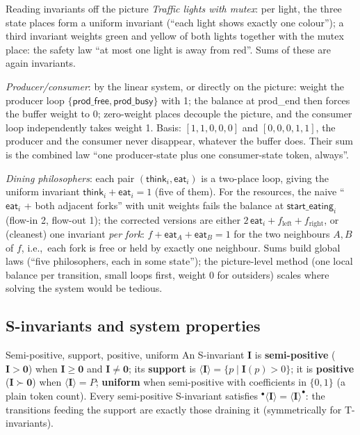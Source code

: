 \begin{examplebox}{Reading invariants off the picture}
\emph{Traffic lights with mutex}: per light, the three state places form a uniform invariant (``each light shows exactly one colour''); a third invariant weights green and yellow of both lights together with the mutex place: the safety law ``at most one light is away from red''. Sums of these are again invariants.
\par\smallskip
\emph{Producer/consumer}: by the linear system, or directly on the picture: weight the producer loop $\{\textsf{prod\_free}, \textsf{prod\_busy}\}$ with 1; the balance at \textsf{prod\_end} then forces the buffer weight to 0; zero-weight places decouple the picture, and the consumer loop independently takes weight 1. Basis: $[1,1,0,0,0]$ and $[0,0,0,1,1]$, the producer and the consumer never disappear, whatever the buffer does. Their sum is the combined law ``one producer-state plus one consumer-state token, always''.
\par\smallskip
\emph{Dining philosophers}: each pair $(\textsf{think}_i, \textsf{eat}_i)$ is a two-place loop, giving the uniform invariant $\textsf{think}_i + \textsf{eat}_i = 1$ (five of them). For the resources, the naive ``$\textsf{eat}_i$ + both adjacent forks'' with unit weights fails the balance at $\textsf{start\_eating}_i$ (flow-in 2, flow-out 1); the corrected versions are either $2\,\textsf{eat}_i + f_{\text{left}} + f_{\text{right}}$, or (cleanest) one invariant \emph{per fork}: $f + \textsf{eat}_A + \textsf{eat}_B = 1$ for the two neighbours $A, B$ of $f$, i.e.,\ each fork is free or held by exactly one neighbour. Sums build global laws (``five philosophers, each in some state''); the picture-level method (one local balance per transition, small loops first, weight 0 for outsiders) scales where solving the system would be tedious.
\end{examplebox}

\subsection{S-invariants and system properties}

\begin{definitionbox}{Semi-positive, support, positive, uniform}
An S-invariant $\mathbf{I}$ is \textbf{semi-positive} ($\mathbf{I} > \mathbf{0}$) when $\mathbf{I} \geq \mathbf{0}$ and $\mathbf{I} \neq \mathbf{0}$; its \textbf{support} is $\langle \mathbf{I} \rangle = \{p \mid \mathbf{I}(p) > 0\}$; it is \textbf{positive} ($\mathbf{I} \succ \mathbf{0}$) when $\langle \mathbf{I} \rangle = P$; \textbf{uniform} when semi-positive with coefficients in $\{0, 1\}$ (a plain token count). Every semi-positive S-invariant satisfies ${}^\bullet\langle \mathbf{I} \rangle = \langle \mathbf{I} \rangle^\bullet$: the transitions feeding the support are exactly those draining it (symmetrically for T-invariants).
\end{definitionbox}

